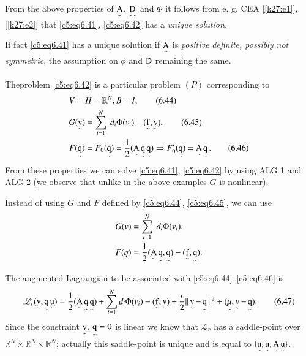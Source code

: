 From the above properties of $\operatorname*{A}\limits_\sim$, $\operatorname*{D}\limits_{\sim\sim}$ 
and $\Phi$ it follows from e. g. CEA [\ref{k27:e1}], [\ref{k27:e2}]
that \eqref{c5:eq6.41},  
\eqref{c5:eq6.42} has a \textit{unique solution.}  

\begin{remark}\label{c5:rem6.4}%
 If fact \eqref{c5:eq6.41} has a unique solution if $\operatorname*{A}\limits_\sim$ is 
 {\em positive definite, possibly not symmetric},  the assumption  on 
 $\phi$ and $\operatorname*{D}\limits_\sim$ remaining the same.   
\end{remark}


The\pageoriginale   problem \eqref{c5:eq6.42} is a particular problem $(P)$ corresponding to 
\begin{align*}
&V = H = \mathbb{R}^N,  B = I, \tag{6.44}\label{c5:eq6.44}\\
&G (\operatorname*{v}\limits_\sim ) = \sum^N_{i=1} ~ d_i \Phi (v_i) - 
(\operatorname*{f}\limits_\sim, \operatorname*{v}\limits_\sim ), \tag{6.45}\label{c5:eq6.45}\\ 
&F (\operatorname*{q}\limits_\sim )  = F_0 (\operatorname*{q}\limits_\sim ) = \frac{1}{2} ( 
\operatorname*{A}\limits_\sim \operatorname*{q}\limits_\sim \operatorname*{q}\limits_\sim ) \Rightarrow F'_0 
(\operatorname*{q}\limits_\sim ) = \operatorname*{A}\limits_\sim \operatorname*{q}\limits_\sim. 
\tag{6.46}\label{c5:eq6.46}   
\end{align*}
From these properties we can solve \eqref{c5:eq6.41}, \eqref{c5:eq6.42} 
by using ALG 1 and ALG 2 (we observe that unlike in the above examples 
$G$ is nonlinear).   

\begin{remark}\label{c5:rem6.5}%
Instead of using $G$ and $F$ defined by \eqref{c5:eq6.44}, 
\eqref{c5:eq6.45},  we can use  
 \begin{align*}
G (v)  &= \sum^N_{i=1} ~ d_i \Phi (v_i), \\
F (q) &= \frac{1}{2} (\operatorname*{A}\limits_\sim \operatorname*{q}\limits_\sim , \operatorname*{q}\limits_\sim ) 
- (\operatorname*{f}\limits_\sim , \operatorname*{q}\limits_\sim ).  
 \end{align*} 
\end{remark}

\noindent
The augmented Lagrangian to be associated with 
\eqref{c5:eq6.44}--\eqref{c5:eq6.46} is  
\begin{equation}
\mathscr{L}_r (\operatorname*{v}\limits_\sim, \operatorname*{q}\limits_\sim\operatorname*{u}\limits_\sim ) = 
\frac{1}{2} (\operatorname*{A}\limits_\sim \operatorname*{q}\limits_\sim \operatorname*{q}\limits_\sim ) + 
\sum^N_{i=1} d_i \Phi (v_i) - (\operatorname*{f}\limits_\sim,  \operatorname*{v} \limits_\sim ) + 
\frac{r}{2}||\operatorname*{v}\limits_\sim-\operatorname*{q}\limits_\sim ||^2 + (\underset{\sim}\mu, 
 \operatorname*{v}\limits_\sim -\operatorname*{q}\limits_\sim ). \tag{6.47}\label{c5:eq6.47}     
\end{equation}
Since the constraint $\operatorname*{v}\limits_\sim$, $\operatorname*{q}\limits_\sim = 0$ is linear 
we know that $\mathscr{L}_r$  has a saddle-point over 
$\mathbb{R}^N\times \mathbb{R}^N \times \mathbb{R}^N$; actually this 
saddle-point is unique and is equal to $\{ \operatorname*{u}\limits_\sim, 
\operatorname*{u}\limits_\sim,  \operatorname*{A}\limits_\sim \operatorname*{u}\limits_\sim \}$.      

